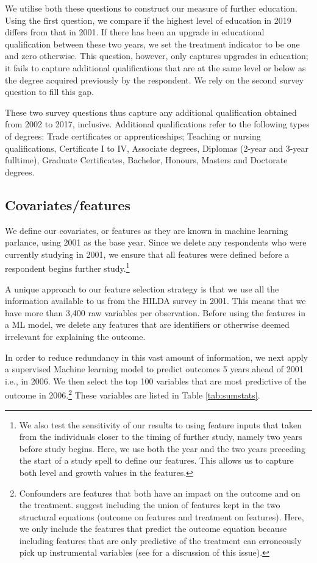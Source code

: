 \documentclass[12pt, a4paper]{article}
\begin{document}
We utilise both these questions to construct our measure of further education. Using the first question, we compare if the highest level of education in 2019 differs from that in 2001. If there has been an upgrade in educational qualification between these two years, we set the treatment indicator to be one and zero otherwise. This question, however, only captures upgrades in education; it fails to capture additional qualifications that are at the same level or below as the degree acquired previously by the respondent. We rely on the second survey question to fill this gap.

These two survey questions thus capture any additional qualification obtained from 2002 to 2017, inclusive. Additional qualifications refer to the following types of degrees: Trade certificates or apprenticeships; Teaching or nursing qualifications, Certificate I to IV, Associate degrees, Diplomas (2-year and 3-year fulltime), Graduate Certificates, Bachelor, Honours, Masters and Doctorate degrees.

\subsection{Covariates/features}

We define our covariates, or features as they are known in machine learning
parlance, using 2001 as the base year. Since we delete any respondents who were
currently studying in 2001, we ensure that all features were defined before a
respondent begins further study.\footnote{We also test the sensitivity of our results to using feature inputs that taken from the
individuals closer to the timing of further study, namely two years before study begins. Here, we use both the year and the two years preceding the start of a study spell to define our features. This allows us to capture both level and growth values in the features.}

A unique approach to our feature selection strategy is that we use all the
information available to us from the HILDA survey in 2001. This means that we
have more than 3,400 raw variables per observation. Before using the features
in a ML model, we delete any features that are identifiers or otherwise deemed
irrelevant for explaining the outcome.

In order to reduce redundancy in this vast amount of information, we next apply a supervised Machine learning model to predict outcomes 5 years ahead of 2001 i.e., in 2006. We then select the top 100 variables that are most predictive of the outcome in 2006.\footnote{Confounders are features that both have an impact on the outcome and on the treatment. \cite{cherno2018} suggest including the union of features kept in the two structural equations (outcome on features and treatment on features). Here, we only include the features that predict the outcome equation because including features that are only predictive of the treatment can erroneously pick up instrumental variables (see \cite{pearl2012class} for a discussion of this issue). } These variables are listed in Table \ref{tab:sumstats}. 
\end{document}
